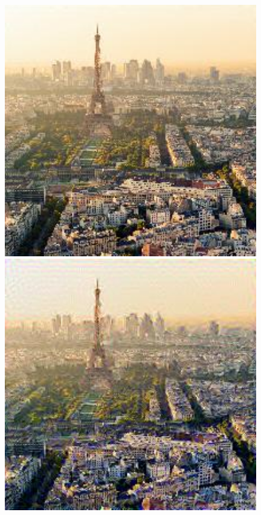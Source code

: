 \documentclass{article}
\begin{document}
\begin{figure}[!htb]
\centering
\begin{minipage}{0.16\textwidth}
\centering
\includegraphics[width=0.98\textwidth]{../Images/transfer/paris_starrynight_1e0_500.jpg}
\end{minipage}%
\begin{minipage}{0.16\textwidth}
\centering
\includegraphics[width=0.98\textwidth]{../Images/transfer/paris_starrynight_1e1_500.jpg}

\end{minipage}
\end{figure}
\end{document}
